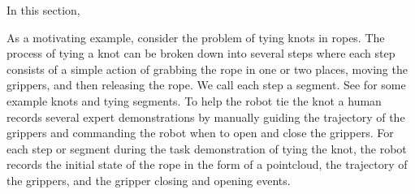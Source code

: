 In this section,

As a motivating example, consider the problem of tying knots in ropes. The process of tying a knot can be broken down into several steps where each step consists of a simple action of grabbing the rope in one or two places, moving the grippers, and then releasing the rope. We call each step a segment. See  for some example knots and tying segments. To help the robot tie the knot a human records several expert demonstrations by manually guiding the trajectory of the grippers and commanding the robot when to open and close the grippers. For each step or segment during the task demonstration of tying the knot, the robot records the initial state of the rope in the form of a pointcloud, the trajectory of the grippers, and the gripper closing and opening events.
